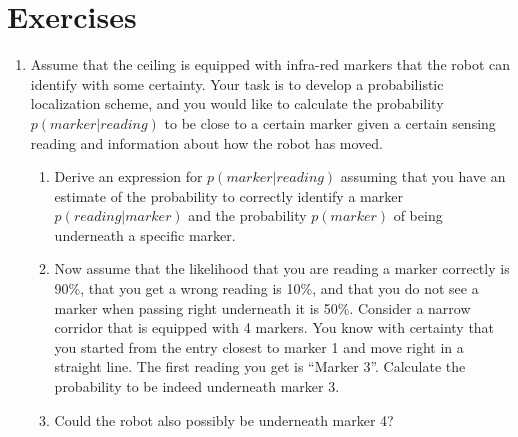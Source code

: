 \section*{Exercises}\small
\begin{enumerate}
\item Assume that the ceiling is equipped with infra-red markers that the robot can identify with some certainty. Your task is to develop a probabilistic localization scheme, and you would like to calculate the probability $p(marker|reading)$ to be close to a certain marker given a certain sensing reading and information about how the robot has moved.
\begin{enumerate}
\item Derive an expression for $p(marker|reading)$ assuming that you have an estimate of the probability to correctly identify a marker $p(reading|marker)$ and the probability $p(marker)$ of being underneath a specific marker.
\item Now assume that the likelihood that you are reading a marker correctly is 90\%, that you get a wrong reading is 10\%, and that you do not see a marker when passing right underneath it is 50\%. Consider a narrow corridor that is equipped with 4 markers. You know with certainty that you started from the entry closest to marker 1 and move right in a straight line. The first reading you get is ``Marker 3''. Calculate the probability to be indeed underneath marker 3.
\item Could the robot also possibly be underneath marker 4?
\end{enumerate}

\end{enumerate}\normalsize
